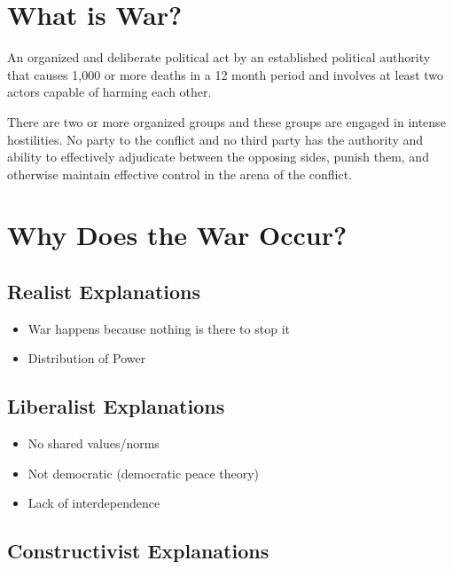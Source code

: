 \documentclass[
]{book}
\begin{document}
\hypertarget{what-is-war}{%
\section{What is War?}\label{what-is-war}}

An organized and deliberate political act by an established political authority that causes 1,000 or more deaths in a 12 month period and involves at least two actors capable of harming each other.

There are two or more organized groups and these groups are engaged in intense hostilities. No party to the conflict and no third party has the authority and ability to effectively adjudicate between the opposing sides, punish them, and otherwise maintain
effective control in the arena of the conflict.

\hypertarget{why-does-the-war-occur}{%
\section{Why Does the War Occur?}\label{why-does-the-war-occur}}

\hypertarget{realist-explanations}{%
\subsection{Realist Explanations}\label{realist-explanations}}

\begin{itemize}
\item
  War happens because nothing is there to stop it
\item
  Distribution of Power
\end{itemize}

\hypertarget{liberalist-explanations}{%
\subsection{Liberalist Explanations}\label{liberalist-explanations}}

\begin{itemize}
\item
  No shared values/norms
\item
  Not democratic (democratic peace theory)
\item
  Lack of interdependence
\end{itemize}

\hypertarget{constructivist-explanations}{%
\subsection{Constructivist Explanations}\label{constructivist-explanations}}
\end{document}

